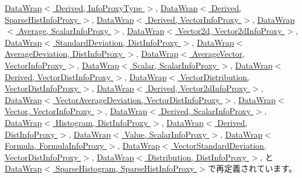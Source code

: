 \hyperlink{classStats_1_1DataWrap_a69ddecf05fa28115a433af3080071d37}{DataWrap$<$ Derived, InfoProxyType $>$}, \hyperlink{classStats_1_1DataWrap_a69ddecf05fa28115a433af3080071d37}{DataWrap$<$ Derived, SparseHistInfoProxy $>$}, \hyperlink{classStats_1_1DataWrap_a69ddecf05fa28115a433af3080071d37}{DataWrap$<$ Derived, VectorInfoProxy $>$}, \hyperlink{classStats_1_1DataWrap_a69ddecf05fa28115a433af3080071d37}{DataWrap$<$ Average, ScalarInfoProxy $>$}, \hyperlink{classStats_1_1DataWrap_a69ddecf05fa28115a433af3080071d37}{DataWrap$<$ Vector2d, Vector2dInfoProxy $>$}, \hyperlink{classStats_1_1DataWrap_a69ddecf05fa28115a433af3080071d37}{DataWrap$<$ StandardDeviation, DistInfoProxy $>$}, \hyperlink{classStats_1_1DataWrap_a69ddecf05fa28115a433af3080071d37}{DataWrap$<$ AverageDeviation, DistInfoProxy $>$}, \hyperlink{classStats_1_1DataWrap_a69ddecf05fa28115a433af3080071d37}{DataWrap$<$ AverageVector, VectorInfoProxy $>$}, \hyperlink{classStats_1_1DataWrap_a69ddecf05fa28115a433af3080071d37}{DataWrap$<$ Scalar, ScalarInfoProxy $>$}, \hyperlink{classStats_1_1DataWrap_a69ddecf05fa28115a433af3080071d37}{DataWrap$<$ Derived, VectorDistInfoProxy $>$}, \hyperlink{classStats_1_1DataWrap_a69ddecf05fa28115a433af3080071d37}{DataWrap$<$ VectorDistribution, VectorDistInfoProxy $>$}, \hyperlink{classStats_1_1DataWrap_a69ddecf05fa28115a433af3080071d37}{DataWrap$<$ Derived, Vector2dInfoProxy $>$}, \hyperlink{classStats_1_1DataWrap_a69ddecf05fa28115a433af3080071d37}{DataWrap$<$ VectorAverageDeviation, VectorDistInfoProxy $>$}, \hyperlink{classStats_1_1DataWrap_a69ddecf05fa28115a433af3080071d37}{DataWrap$<$ Vector, VectorInfoProxy $>$}, \hyperlink{classStats_1_1DataWrap_a69ddecf05fa28115a433af3080071d37}{DataWrap$<$ Derived, ScalarInfoProxy $>$}, \hyperlink{classStats_1_1DataWrap_a69ddecf05fa28115a433af3080071d37}{DataWrap$<$ Histogram, DistInfoProxy $>$}, \hyperlink{classStats_1_1DataWrap_a69ddecf05fa28115a433af3080071d37}{DataWrap$<$ Derived, DistInfoProxy $>$}, \hyperlink{classStats_1_1DataWrap_a69ddecf05fa28115a433af3080071d37}{DataWrap$<$ Value, ScalarInfoProxy $>$}, \hyperlink{classStats_1_1DataWrap_a69ddecf05fa28115a433af3080071d37}{DataWrap$<$ Formula, FormulaInfoProxy $>$}, \hyperlink{classStats_1_1DataWrap_a69ddecf05fa28115a433af3080071d37}{DataWrap$<$ VectorStandardDeviation, VectorDistInfoProxy $>$}, \hyperlink{classStats_1_1DataWrap_a69ddecf05fa28115a433af3080071d37}{DataWrap$<$ Distribution, DistInfoProxy $>$}, と \hyperlink{classStats_1_1DataWrap_a69ddecf05fa28115a433af3080071d37}{DataWrap$<$ SparseHistogram, SparseHistInfoProxy $>$}で再定義されています。


